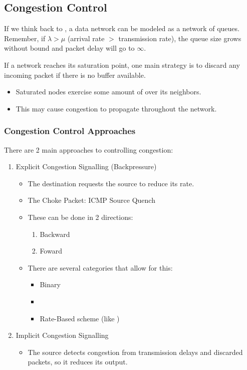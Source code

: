 \subsection{Congestion Control}\label{subsec:Congestion_Control}

If we think back to , a data network can be modeled as a network of queues.
Remember, if $\lambda > \mu$ (arrival rate $>$ transmission rate), the queue size grows without bound and packet delay will go to $\infty$.

If a network reaches its saturation point, one main strategy is to discard any incoming packet if there is no buffer available.
\begin{itemize}[noitemsep]
\item Saturated nodes exercise some amount of  over its neighbors.
\item This may cause congestion to propagate throughout the network.
\end{itemize}

\subsubsection{Congestion Control Approaches}\label{subsubsec:Congestion_Control_Approaches}
There are 2 main approaches to controlling congestion:
\begin{enumerate}[noitemsep]
\item Explicit Congestion Signalling (Backpressure)
  \begin{itemize}[noitemsep]
  \item The destination requests the source to reduce its rate.
  \item The Choke Packet: ICMP Source Quench
  \item These can be done in 2 directions:
    \begin{enumerate}[noitemsep]
    \item Backward
    \item Foward
    \end{enumerate}
  \item There are several categories that allow for this:
    \begin{itemize}[noitemsep]
    \item Binary
    \item {}
    \item Rate-Based scheme (like )
    \end{itemize}
  \end{itemize}

\item Implicit Congestion Signalling
  \begin{itemize}[noitemsep]
  \item The source detects congestion from transmission delays and discarded packets, so it reduces its output.
  \end{itemize}
\end{enumerate}

